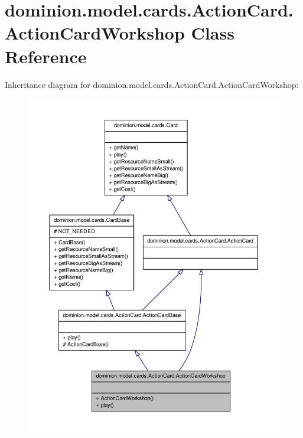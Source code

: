 \hypertarget{classdominion_1_1model_1_1cards_1_1ActionCard_1_1ActionCardWorkshop}{\section{dominion.\-model.\-cards.\-Action\-Card.\-Action\-Card\-Workshop \-Class \-Reference}
\label{classdominion_1_1model_1_1cards_1_1ActionCard_1_1ActionCardWorkshop}
}


\-Inheritance diagram for dominion.\-model.\-cards.\-Action\-Card.\-Action\-Card\-Workshop\-:
\nopagebreak
\begin{figure}[H]
\begin{center}
\leavevmode
\includegraphics[width=350pt]{classdominion_1_1model_1_1cards_1_1ActionCard_1_1ActionCardWorkshop__inherit__graph}
\end{center}
\end{figure}


